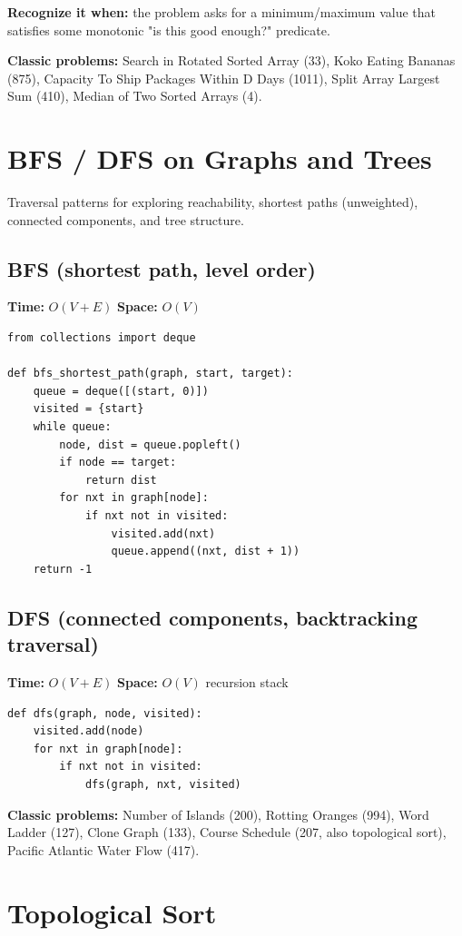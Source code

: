 \documentclass[11pt]{article}
\newcommand{\complexity}[2]{\textbf{Time:} #1 \quad \textbf{Space:} #2}
\begin{document}
\textbf{Recognize it when:} the problem asks for a minimum/maximum value
that satisfies some monotonic "is this good enough?" predicate.

\textbf{Classic problems:} Search in Rotated Sorted Array (33), Koko
Eating Bananas (875), Capacity To Ship Packages Within D Days (1011),
Split Array Largest Sum (410), Median of Two Sorted Arrays (4).

\section{BFS / DFS on Graphs and Trees}

Traversal patterns for exploring reachability, shortest paths (unweighted),
connected components, and tree structure.

\subsection{BFS (shortest path, level order)}
\complexity{$O(V + E)$}{$O(V)$}

\begin{lstlisting}
from collections import deque

def bfs_shortest_path(graph, start, target):
    queue = deque([(start, 0)])
    visited = {start}
    while queue:
        node, dist = queue.popleft()
        if node == target:
            return dist
        for nxt in graph[node]:
            if nxt not in visited:
                visited.add(nxt)
                queue.append((nxt, dist + 1))
    return -1
\end{lstlisting}

\subsection{DFS (connected components, backtracking traversal)}
\complexity{$O(V + E)$}{$O(V)$ recursion stack}

\begin{lstlisting}
def dfs(graph, node, visited):
    visited.add(node)
    for nxt in graph[node]:
        if nxt not in visited:
            dfs(graph, nxt, visited)
\end{lstlisting}

\textbf{Classic problems:} Number of Islands (200), Rotting Oranges (994),
Word Ladder (127), Clone Graph (133), Course Schedule (207, also
topological sort), Pacific Atlantic Water Flow (417).

\section{Topological Sort}
\end{document}
